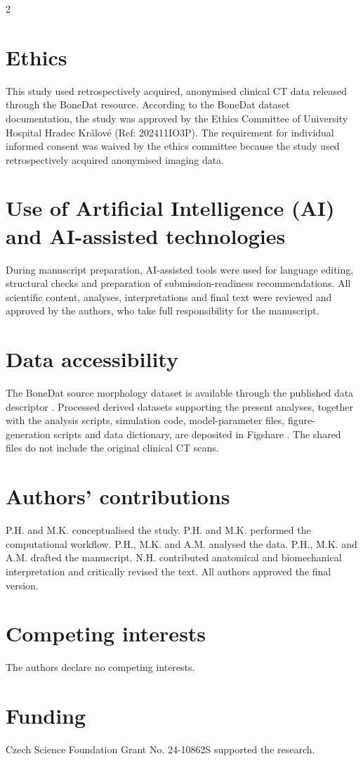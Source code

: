 \documentclass[openacc]{rsproca_new}
\begin{document}
\begin{multicols}{2}
\section*{Ethics}

This study used retrospectively acquired, anonymised clinical CT data released through the BoneDat resource. According to the BoneDat dataset documentation, the study was approved by the Ethics Committee of University Hospital Hradec Kr\'{a}lov\'{e} (Ref: 202411IO3P). The requirement for individual informed consent was waived by the ethics committee because the study used retrospectively acquired anonymised imaging data.

\section*{Use of Artificial Intelligence (AI) and AI-assisted technologies}
During manuscript preparation, AI-assisted tools were used for language editing, structural checks and preparation of submission-readiness recommendations. All scientific content, analyses, interpretations and final text were reviewed and approved by the authors, who take full responsibility for the manuscript.

\section*{Data accessibility}

The BoneDat source morphology dataset is available through the published data descriptor \cite{HenysKuchar2025}. Processed derived datasets supporting the present analyses, together with the analysis scripts, simulation code, model-parameter files, figure-generation scripts and data dictionary, are deposited in Figshare \cite{HenysPelvicModalFigshare2026}. The shared files do not include the original clinical CT scans.

\section*{Authors' contributions}

P.H. and M.K. conceptualised the study. P.H. and M.K. performed the computational workflow. P.H., M.K. and A.M. analysed the data. P.H., M.K. and A.M. drafted the manuscript. N.H. contributed anatomical and biomechanical interpretation and critically revised the text. All authors approved the final version.

\section*{Competing interests}

The authors declare no competing interests.

\section*{Funding}
Czech Science Foundation Grant No. 24-10862S supported the research.
\end{multicols}
\end{document}
